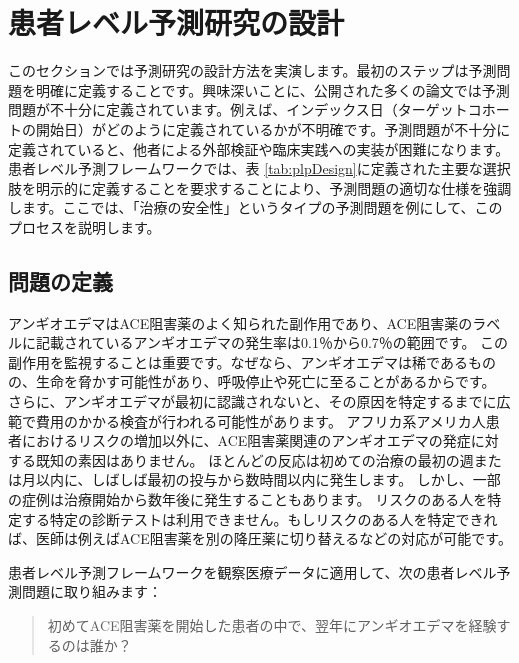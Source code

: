 \documentclass[
  11pt]{book}
\theoremstyle{definition}
\theoremstyle{definition}
\theoremstyle{definition}
\theoremstyle{definition}
\theoremstyle{remark}
\begin{document}
\section{患者レベル予測研究の設計}\label{ux60a3ux8005ux30ecux30d9ux30ebux4e88ux6e2cux7814ux7a76ux306eux8a2dux8a08}

このセクションでは予測研究の設計方法を実演します。最初のステップは予測問題を明確に定義することです。興味深いことに、公開された多くの論文では予測問題が不十分に定義されています。例えば、インデックス日（ターゲットコホートの開始日）がどのように定義されているかが不明確です。予測問題が不十分に定義されていると、他者による外部検証や臨床実践への実装が困難になります。患者レベル予測フレームワークでは、表 \ref{tab:plpDesign}に定義された主要な選択肢を明示的に定義することを要求することにより、予測問題の適切な仕様を強調します。ここでは、「治療の安全性」というタイプの予測問題を例にして、このプロセスを説明します。 

\subsection{問題の定義}\label{ux554fux984cux306eux5b9aux7fa9-2}

アンギオエデマはACE阻害薬のよく知られた副作用であり、ACE阻害薬のラベルに記載されているアンギオエデマの発生率は0.1％から0.7％の範囲です。\citep[ ]{byrd_2006} この副作用を監視することは重要です。なぜなら、アンギオエデマは稀であるものの、生命を脅かす可能性があり、呼吸停止や死亡に至ることがあるからです。\citep[ ]{norman_2013} さらに、アンギオエデマが最初に認識されないと、その原因を特定するまでに広範で費用のかかる検査が行われる可能性があります。\citep[ ]{norman_2013, thompson_1993} アフリカ系アメリカ人患者におけるリスクの増加以外に、ACE阻害薬関連のアンギオエデマの発症に対する既知の素因はありません。\citep[ ]{byrd_2006} ほとんどの反応は初めての治療の最初の週または月以内に、しばしば最初の投与から数時間以内に発生します。\citep[ ]{circardi_2004} しかし、一部の症例は治療開始から数年後に発生することもあります。\citep[ ]{mara_1996} リスクのある人を特定する特定の診断テストは利用できません。もしリスクのある人を特定できれば、医師は例えばACE阻害薬を別の降圧薬に切り替えるなどの対応が可能です。  

患者レベル予測フレームワークを観察医療データに適用して、次の患者レベル予測問題に取り組みます：

\begin{quote}
初めてACE阻害薬を開始した患者の中で、翌年にアンギオエデマを経験するのは誰か？
\end{quote}
\end{document}
